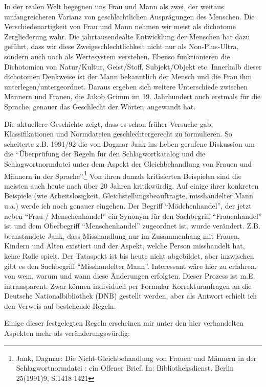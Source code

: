 \documentclass[a4paper,
fontsize=11pt,
oneside,
numbers=noperiodatend,
parskip=half-,
bibliography=totoc,
final
]{scrartcl}
\begin{document}
In der realen Welt begegnen uns Frau und Mann als zwei, der weitaus
umfangreicheren Varianz von geschlechtlichen Ausprägungen des Menschen.
Die Verschiedenartigkeit von Frau und Mann nehmen wir meist als
dichotome Zergliederung wahr. Die jahrtausendealte Entwicklung der
Menschen hat dazu geführt, dass wir diese Zweigeschlechtlichkeit nicht
nur als Non-Plus-Ultra, sondern auch noch als Wertesystem verstehen.
Ebenso funktionieren die Dichotomien von Natur/Kultur, Geist/Stoff,
Subjekt/Objekt etc. Innerhalb dieser dichotomen Denkweise ist der Mann
bekanntlich der Mensch und die Frau ihm unterlegen/untergeordnet. Daraus
ergeben sich weitere Unterschiede zwischen Männern und Frauen, die Jakob
Grimm im 19. Jahrhundert auch erstmals für die Sprache, genauer das
Geschlecht der Wörter, angewandt hat.

Die aktuellere Geschichte zeigt, dass es schon früher Versuche gab,
Klassifikationen und Normdateien geschlechtergerecht zu formulieren. So
scheiterte z.B. 1991/92 die von Dagmar Jank ins Leben gerufene
Diskussion um die \enquote{Überprüfung der Regeln für den
Schlagwortkatalog und die Schlagwortnormdatei unter dem Aspekt der
Gleichbehandlung von Frauen und Männern in der Sprache}.\footnote{Jank,
  Dagmar: Die Nicht-Gleichbehandlung von Frauen und Männern in der
  Schlagwortnormdatei : ein Offener Brief. In: Bibliotheksdienst. Berlin
  25(1991)9, S.1418-1421} Von ihren damals kritisierten Beispielen sind
die meisten auch heute nach über 20 Jahren kritikwürdig. Auf einige
ihrer konkreten Beispiele (wie Arbeitslosigkeit,
Gleichstellungsbeauftragte, misshandelter Mann u.a.) werde ich noch
genauer eingehen. Der Begriff \enquote{Mädchenhandel}, der jetzt neben
\enquote{Frau / Menschenhandel} ein Synonym für den Sachbegriff
\enquote{Frauenhandel} ist und dem Oberbegriff \enquote{Menschenhandel}
zugeordnet ist, wurde verändert. Z.B. beanstandete Jank, dass
Misshandlung nur im Zusammenhang mit Frauen, Kindern und Alten existiert
und der Aspekt, welche Person misshandelt hat, keine Rolle spielt. Der
Tataspekt ist bis heute nicht abgebildet, aber inzwischen gibt es den
Sachbegriff \enquote{Misshandelter Mann}. Interessant wäre hier zu
erfahren, von wem, warum und wann diese Änderungen erfolgten. Dieser
Prozess ist m.E. intransparent. Zwar können individuell per Formular
Korrekturanfragen an die Deutsche Nationalbibliothek (DNB) gestellt
werden, aber als Antwort erhielt ich den Verweis auf bestehende Regeln.~

Einige dieser festgelegten Regeln erscheinen mir unter den hier
verhandelten Aspekten mehr als veränderungswürdig:
\end{document}
